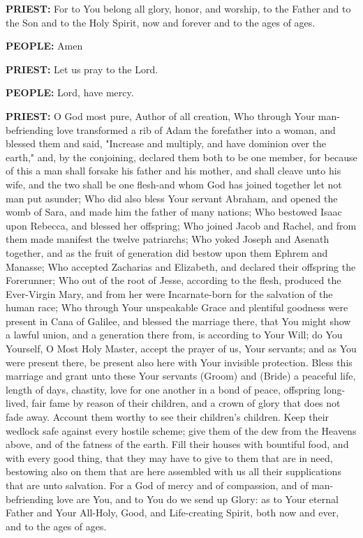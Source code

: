 \textbf{PRIEST:} For to You belong all glory, honor, and worship, to the
Father and to the Son and to the Holy Spirit, now and forever and to the
ages of ages.

\textbf{PEOPLE:} Amen

\textbf{PRIEST:} Let us pray to the Lord.

\textbf{PEOPLE:} Lord, have mercy.

\textbf{PRIEST:} O God most pure, Author of all creation, Who through
Your man-befriending love transformed a rib of Adam the forefather into
a woman, and blessed them and said, "Increase and multiply, and have
dominion over the earth," and, by the conjoining, declared them both to
be one member, for because of this a man shall forsake his father and
his mother, and shall cleave unto his wife, and the two shall be one
flesh-and whom God has joined together let not man put asunder; Who did
also bless Your servant Abraham, and opened the womb of Sara, and made
him the father of many nations; Who bestowed Isaac upon Rebecca, and
blessed her offspring; Who joined Jacob and Rachel, and from them made
manifest the twelve patriarchs; Who yoked Joseph and Asenath together,
and as the fruit of generation did bestow upon them Ephrem and Manasse;
Who accepted Zacharias and Elizabeth, and declared their offspring the
Forerunner; Who out of the root of Jesse, according to the flesh,
produced the Ever-Virgin Mary, and from her were Incarnate-born for the
salvation of the human race; Who through Your unspeakable Grace and
plentiful goodness were present in Cana of Galilee, and blessed the
marriage there, that You might show a lawful union, and a generation
there from, is according to Your Will; do You Yourself, O Most Holy
Master, accept the prayer of us, Your servants; and as You were present
there, be present also here with Your invisible protection. Bless this
marriage and grant unto these Your servants (Groom) and (Bride) a
peaceful life, length of days, chastity, love for one another in a bond
of peace, offspring long-lived, fair fame by reason of their children,
and a crown of glory that does not fade away. Account them worthy to see
their children's children. Keep their wedlock safe against every hostile
scheme; give them of the dew from the Heavens above, and of the fatness
of the earth. Fill their houses with bountiful food, and with every good
thing, that they may have to give to them that are in need, bestowing
also on them that are here assembled with us all their supplications
that are unto salvation. For a God of mercy and of compassion, and of
man-befriending love are You, and to You do we send up Glory: as to Your
eternal Father and Your All-Holy, Good, and Life-creating Spirit, both
now and ever, and to the ages of ages.

